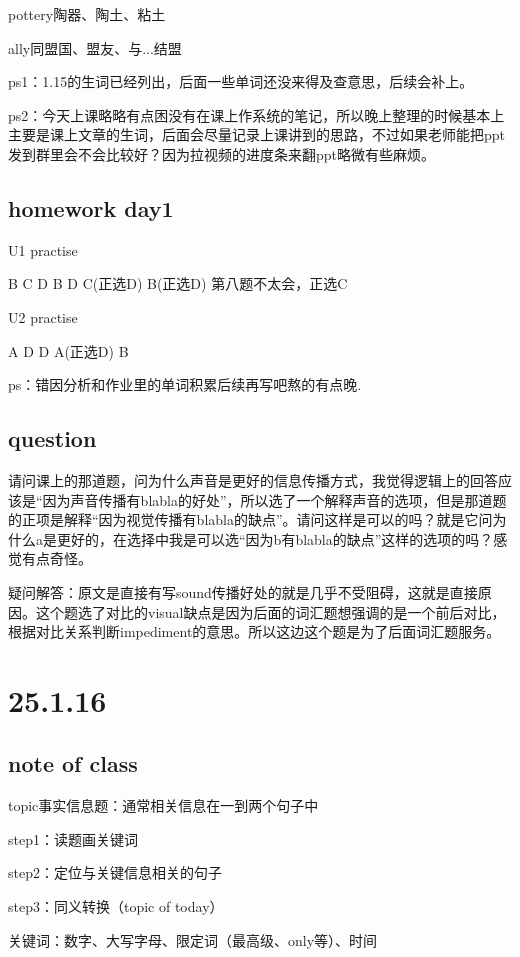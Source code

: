 \documentclass[a4paper, 10pt]{article}
\begin{document}
pottery陶器、陶土、粘土

ally同盟国、盟友、与...结盟

ps1：1.15的生词已经列出，后面一些单词还没来得及查意思，后续会补上。

ps2：今天上课略略有点困没有在课上作系统的笔记，所以晚上整理的时候基本上主要是课上文章的生词，后面会尽量记录上课讲到的思路，不过如果老师能把ppt发到群里会不会比较好？因为拉视频的进度条来翻ppt略微有些麻烦。

\subsection{homework day1}

U1 practise


B  C  D  B  D  C(正选D)  B(正选D)  第八题不太会，正选C


U2 practise

A  D  D  A(正选D)  B

ps：错因分析和作业里的单词积累后续再写吧熬的有点晚.


\subsection{question}
请问课上的那道题，问为什么声音是更好的信息传播方式，我觉得逻辑上的回答应该是“因为声音传播有blabla的好处”，所以选了一个解释声音的选项，但是那道题的正项是解释“因为视觉传播有blabla的缺点”。请问这样是可以的吗？就是它问为什么a是更好的，在选择中我是可以选“因为b有blabla的缺点”这样的选项的吗？感觉有点奇怪。

疑问解答：原文是直接有写sound传播好处的就是几乎不受阻碍，这就是直接原因。这个题选了对比的visual缺点是因为后面的词汇题想强调的是一个前后对比，根据对比关系判断impediment的意思。所以这边这个题是为了后面词汇题服务。

\section{25.1.16}

\subsection{note of class}

topic事实信息题：通常相关信息在一到两个句子中

step1：读题画关键词

step2：定位与关键信息相关的句子

step3：同义转换（topic of today）

关键词：数字、大写字母、限定词（最高级、only等）、时间
\end{document}

